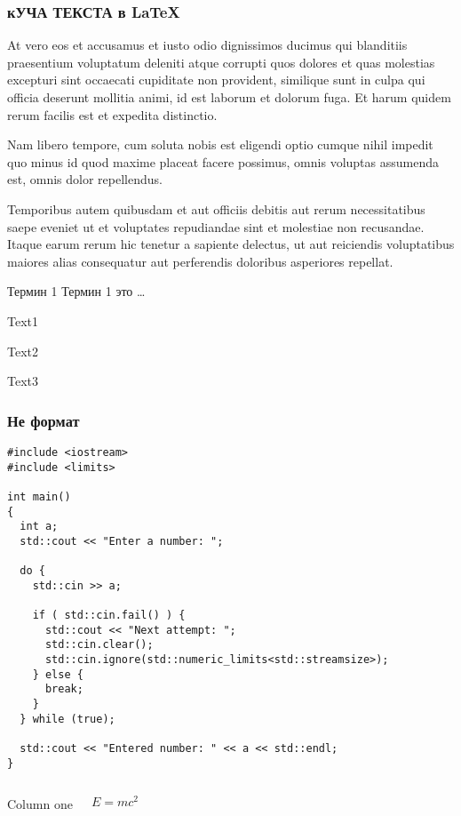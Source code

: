 \documentclass[brown]{beamer}
\begin{document}
\begin{frame}[plain]
\frametitle{кУЧА ТЕКСТА в \LaTeX}

At vero \alert<2>{eos et accusamus et iusto} odio dignissimos ducimus qui blanditiis praesentium voluptatum deleniti \alert{atque corrupti quos} dolores et quas {\color{green} molestias excepturi sint occaecati} cupiditate non provident, similique \alert<1>{sunt in culpa qui officia} deserunt mollitia animi, id est laborum et dolorum fuga. Et harum quidem rerum facilis est et expedita distinctio. 

Nam libero tempore, cum soluta nobis est eligendi optio cumque nihil impedit \alert<3>{quo minus id quod maxime placeat facere} possimus, omnis voluptas assumenda est, omnis dolor repellendus. 

Temporibus autem quibusdam et aut officiis debitis aut rerum necessitatibus saepe eveniet ut et voluptates repudiandae sint et molestiae non recusandae. Itaque earum rerum hic tenetur a sapiente delectus, ut aut reiciendis voluptatibus maiores alias consequatur aut perferendis doloribus asperiores repellat.
\end{frame}

\begin{frame}

\begin{block}{Термин 1}
Термин 1 это \ldots
\end{block}

Text1 


Text2


Text3
\end{frame}

\begin{frame}[fragile]
\frametitle{Не формат}
{
\fontsize{10pt}{10pt}\selectfont

\begin{verbatim}
#include <iostream>
#include <limits>

int main()
{
  int a;
  std::cout << "Enter a number: ";
  
  do {
    std::cin >> a;
  
    if ( std::cin.fail() ) {
      std::cout << "Next attempt: ";
      std::cin.clear();
      std::cin.ignore(std::numeric_limits<std::streamsize>);
    } else {
      break;
    }
  } while (true);
  
  std::cout << "Entered number: " << a << std::endl;
}
\end{verbatim}
}
\end{frame}

\begin{frame}

\begin{columns}
Column one

$$E = mc^2$$
\end{columns}

\end{frame}
\end{document}
